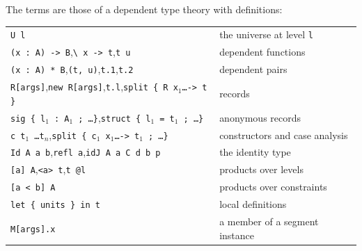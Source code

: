 \documentclass[11pt]{article}
\newcommand{\kw}[1]{\texttt{#1}}
\theoremstyle{remark}
\begin{document}
The terms are those of a dependent type theory with definitions:
\begin{center}
\begin{tabular}{ll}
\kw{U l} & the universe at level \kw{l}\\
\kw{(x : A) -> B},\quad \kw{\textbackslash\ x -> t},\quad \kw{t u} & dependent functions\\
\kw{(x : A) * B},\quad \kw{(t, u)},\quad \kw{t.1},\quad \kw{t.2} & dependent pairs\\
\kw{R[args]},\quad \kw{new R[args]},\quad \kw{t.l},\quad \kw{split \{ R x$_1$\dots -> t \}} & records\\
\kw{sig \{ l$_1$ : A$_1$ ; \dots \}},\quad \kw{struct \{ l$_1$ = t$_1$ ; \dots \}} & anonymous records\\
\kw{c t$_1$ \dots t$_n$},\quad \kw{split \{ c$_1$ x$_1$\dots -> t$_1$ ; \dots \}} & constructors and case analysis\\
\kw{Id A a b},\quad \kw{refl a},\quad \kw{idJ A a C d b p} & the identity type\\
\kw{[a] A},\quad \kw{<a> t},\quad \kw{t @l} & products over levels\\
\kw{[a < b] A} & products over constraints\\
\kw{let \{ units \} in t} & local definitions\\
\kw{M[args].x} & a member of a segment instance
\end{tabular}
\end{center}
\end{document}
